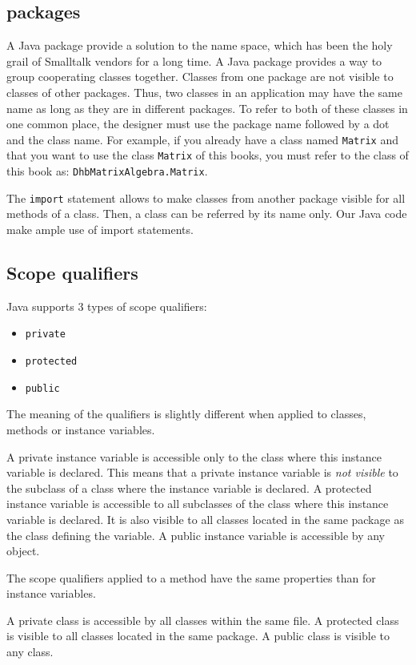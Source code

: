 \documentclass[twoside]{book}
\begin{document}
\subsection{packages}
A Java package provide a solution to the name space, which has
been the holy grail of Smalltalk vendors for a long time. A Java
package provides a way to group cooperating classes together.
Classes from one package are not visible to classes of other
packages. Thus, two classes in an application may have the same
name as long as they are in different packages. To refer to both
of these classes in one common place, the designer must use the
package name followed by a dot and the class name. For example, if
you already have a class named {\tt Matrix} and that you want to
use the class {\tt Matrix} of this books, you must refer to the
class of this book as: {\tt DhbMatrixAlgebra.Matrix}.

The {\tt import} statement allows to make classes from another
package visible for all methods of a class. Then, a class can be
referred by its name only. Our Java code make ample use of import
statements.

\subsection{Scope qualifiers}
Java supports 3 types of scope qualifiers:
\begin{itemize}
  \item {\tt private}
  \item {\tt protected}
  \item {\tt public}
\end{itemize}
The meaning of the qualifiers is slightly different when applied
to classes, methods or instance variables.

A private instance variable is accessible only to the class where
this instance variable is declared. This means that a private
instance variable is {\sl not visible} to the subclass of a class
where the instance variable is declared. A protected instance
variable is accessible to all subclasses of the class where this
instance variable is declared. It is also visible to all classes
located in the same package as the class defining the variable. A
public instance variable is accessible by any object.

\noindent The scope qualifiers applied to a method have the same
properties than for instance variables.

A private class is accessible by all classes within the same file.
A protected class is visible to all classes located in the same
package. A public class is visible to any class.
\end{document}
